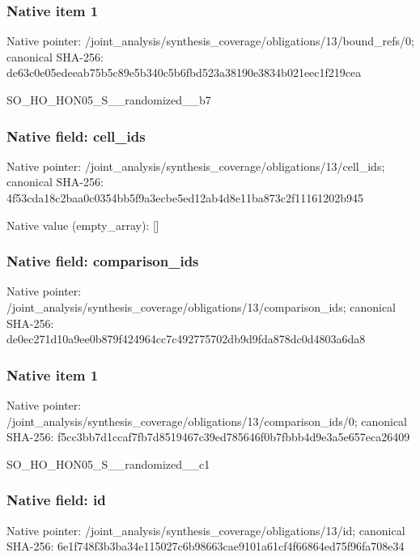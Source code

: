 \documentclass[10pt,a4paper]{article}
\begin{document}
\subsubsection{Native item 1}
Native pointer: /joint\_\allowbreak{}analysis/synthesis\_\allowbreak{}coverage/obligations/13/bound\_\allowbreak{}refs/0; canonical SHA-256: de63c0e05edeeab75b5c89e5b340c5b6fbd523a38190e3834b021eec1f219cea

\begingroup\raggedright\sloppy SO\_\allowbreak{}HO\_\allowbreak{}HON05\_\allowbreak{}S\_\allowbreak{}\_\allowbreak{}randomized\_\allowbreak{}\_\allowbreak{}b7\par\endgroup

\subsubsection{Native field: cell\_\allowbreak{}ids}
Native pointer: /joint\_\allowbreak{}analysis/synthesis\_\allowbreak{}coverage/obligations/13/cell\_\allowbreak{}ids; canonical SHA-256: 4f53cda18c2baa0c0354bb5f9a3ecbe5ed12ab4d8e11ba873c2f11161202b945

Native value (empty\_\allowbreak{}array): []

\subsubsection{Native field: comparison\_\allowbreak{}ids}
Native pointer: /joint\_\allowbreak{}analysis/synthesis\_\allowbreak{}coverage/obligations/13/comparison\_\allowbreak{}ids; canonical SHA-256: de0ec271d10a9ee0b879f424964cc7c492775702db9d9fda878dc0d4803a6da8

\subsubsection{Native item 1}
Native pointer: /joint\_\allowbreak{}analysis/synthesis\_\allowbreak{}coverage/obligations/13/comparison\_\allowbreak{}ids/0; canonical SHA-256: f5cc3bb7d1ccaf7fb7d8519467c39ed785646f0b7fbbb4d9e3a5e657eca26409

\begingroup\raggedright\sloppy SO\_\allowbreak{}HO\_\allowbreak{}HON05\_\allowbreak{}S\_\allowbreak{}\_\allowbreak{}randomized\_\allowbreak{}\_\allowbreak{}c1\par\endgroup

\subsubsection{Native field: id}
Native pointer: /joint\_\allowbreak{}analysis/synthesis\_\allowbreak{}coverage/obligations/13/id; canonical SHA-256: 6e1f748f3b3ba34e115027c6b98663cae9101a61cf4f66864ed75f96fa708e34
\end{document}
